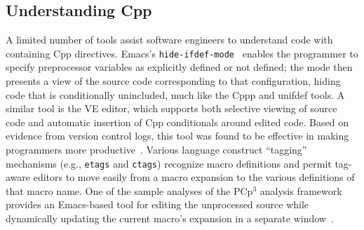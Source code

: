 \documentclass[10pt]{article}
\newcommand{\pcp}{\mbox{\textsf{PCp}$^3$}}
\begin{document}



\subsection{Understanding Cpp}

A limited number of tools assist software engineers to
understand code with containing Cpp directives.  Emacs's
\texttt{hide-ifdef-mode}~\cite{GNUEmacs19.26} enables the programmer to specify
preprocessor variables as explicitly defined or not defined; the mode then
presents a view of the source code corresponding to that configuration,
hiding code that is conditionally unincluded, much like the Cppp and
unifdef tools.  A similar tool is the VE editor, which supports both
selective viewing of source code and automatic insertion of Cpp
conditionals around edited code.  Based on evidence from version control
logs, this tool was found to be effective in making programmers more
productive~\cite{AtkinsBGM99}.  Various language construct ``tagging''
mechanisms (e.g., \texttt{etags} and \texttt{ctags}) recognize macro
definitions and permit tag-aware editors to move easily from a macro
expansion to the various definitions of that macro name.  One of the sample
analyses of the \pcp{} analysis framework provides an Emacs-based tool
for editing the unprocessed source while dynamically updating the current
macro's expansion in a separate window~\cite{CppAwareCAnalyses}.
\end{document}
